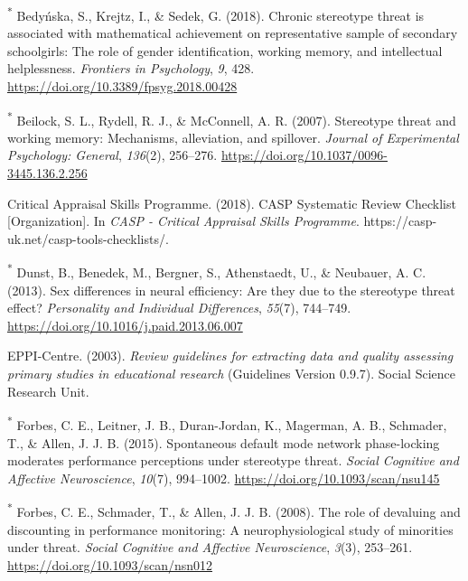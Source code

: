 \documentclass[
  stu,floatsintext]{apa7}
\newlength{\cslhangindent}
\newenvironment{CSLReferences}[2] %
 {\begin{list}{}{%
  \setlength{\itemindent}{0pt}
  \setlength{\leftmargin}{0pt}
  \setlength{\parsep}{0pt}
  \ifodd #1
   \setlength{\leftmargin}{\cslhangindent}
   \setlength{\itemindent}{-1\cslhangindent}
  \fi
  \setlength{\itemsep}{#2\baselineskip}}}
 {\end{list}}
\begin{document}
\begin{CSLReferences}{1}{0}
\textsuperscript{*} Bedyńska, S., Krejtz, I., \& Sedek, G. (2018). Chronic stereotype threat is associated with mathematical achievement on representative sample of secondary schoolgirls: {The} role of gender identification, working memory, and intellectual helplessness. \emph{Frontiers in Psychology}, \emph{9}, 428. \url{https://doi.org/10.3389/fpsyg.2018.00428}

\textsuperscript{*} Beilock, S. L., Rydell, R. J., \& McConnell, A. R. (2007). Stereotype threat and working memory: {Mechanisms}, alleviation, and spillover. \emph{Journal of Experimental Psychology: General}, \emph{136}(2), 256--276. \url{https://doi.org/10.1037/0096-3445.136.2.256}

Critical Appraisal Skills Programme. (2018). {CASP Systematic Review Checklist} {[}Organization{]}. In \emph{CASP - Critical Appraisal Skills Programme}. https://casp-uk.net/casp-tools-checklists/.

\textsuperscript{*} Dunst, B., Benedek, M., Bergner, S., Athenstaedt, U., \& Neubauer, A. C. (2013). Sex differences in neural efficiency: {Are} they due to the stereotype threat effect? \emph{Personality and Individual Differences}, \emph{55}(7), 744--749. \url{https://doi.org/10.1016/j.paid.2013.06.007}

EPPI-Centre. (2003). \emph{Review guidelines for extracting data and quality assessing primary studies in educational research} (Guidelines Version 0.9.7). Social Science Research Unit.

\textsuperscript{*} Forbes, C. E., Leitner, J. B., Duran-Jordan, K., Magerman, A. B., Schmader, T., \& Allen, J. J. B. (2015). Spontaneous default mode network phase-locking moderates performance perceptions under stereotype threat. \emph{Social Cognitive and Affective Neuroscience}, \emph{10}(7), 994--1002. \url{https://doi.org/10.1093/scan/nsu145}

\textsuperscript{*} Forbes, C. E., Schmader, T., \& Allen, J. J. B. (2008). The role of devaluing and discounting in performance monitoring: A neurophysiological study of minorities under threat. \emph{Social Cognitive and Affective Neuroscience}, \emph{3}(3), 253--261. \url{https://doi.org/10.1093/scan/nsn012}


\end{CSLReferences}
\end{document}
